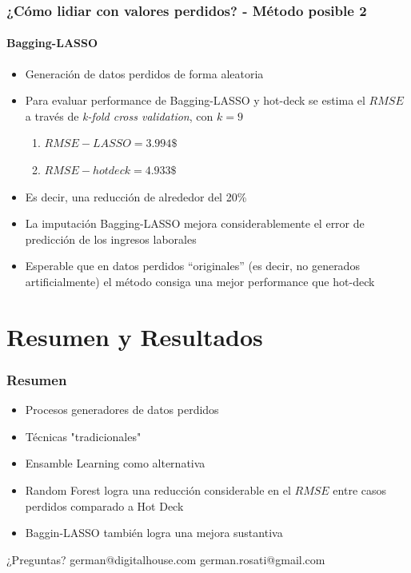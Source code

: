 \documentclass{beamer}
\begin{document}
\begin{frame}
\frametitle{¿Cómo lidiar con valores perdidos? - Método posible 2}
\framesubtitle{Bagging-LASSO}
\begin{itemize}
	\item{Generación de datos perdidos de forma aleatoria}
	\item{Para evaluar performance de Bagging-LASSO y hot-deck se estima el $RMSE$ a través de \emph{k-fold cross validation}, con $k=9$}
	\begin{enumerate}
		\item{$RMSE-LASSO = 3.994\$$}
		\item{$RMSE-hot deck = 4.933\$$}
	\end{enumerate}
	\item{Es decir, una reducción de alrededor del 20\%}
	\item{La imputación Bagging-LASSO mejora considerablemente el error de predicción de los ingresos laborales}
	\item{Esperable que en datos perdidos “originales” (es decir, no generados 		artificialmente) el método consiga una mejor performance que hot-deck}
\end{itemize}
\end{frame}

\section{Resumen y Resultados}
\begin{frame}
	\frametitle{Resumen}
	\begin{itemize}
		\item Procesos generadores de datos perdidos
		\item Técnicas "tradicionales"
		\item Ensamble Learning como alternativa
		\item Random Forest logra una reducción considerable en el $RMSE$ entre casos perdidos comparado a Hot Deck
		\item Baggin-LASSO también logra una mejora sustantiva
	\end{itemize}
\end{frame}

\begin{frame}
	\begin{center}
	{\huge ¿Preguntas?
		\linebreak
		\linebreak
		\linebreak
		\linebreak}
	{\Large
		\color{blue}
		german@digitalhouse.com \linebreak
		german.rosati@gmail.com
	}
	\end{center}
\end{frame}
	
\end{document}
